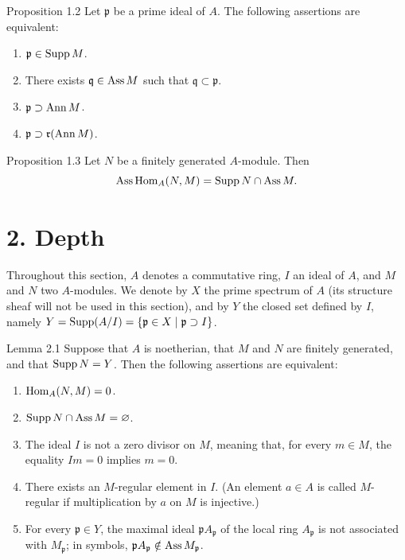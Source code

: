 \begin{sgastatement}{Proposition 1.2}
Let $\mathfrak p$ be a prime ideal of $A$. The following assertions are
equivalent:
\begin{enumerate}[label=\textup{(\roman*)},leftmargin=2.8em]
  \item $\mathfrak p\in\operatorname{Supp} M$.
  \item There exists $\mathfrak q\in\operatorname{Ass} M$ such that
  $\mathfrak q\subset\mathfrak p$.
  \item $\mathfrak p\supset\operatorname{Ann} M$.
  \item[\textup{(iii bis)}] $\mathfrak p\supset\mathfrak r(\operatorname{Ann} M)$.
\end{enumerate}
\end{sgastatement}

\begin{sgastatement}{Proposition 1.3}
Let $N$ be a finitely generated $A$-module. Then
\[
  \operatorname{Ass}\operatorname{Hom}_A(N,M)=\operatorname{Supp} N\cap\operatorname{Ass} M.
\]
\end{sgastatement}



\section*{2. Depth}

Throughout this section, $A$ denotes a commutative ring, $I$ an ideal of
$A$, and $M$ and $N$ two $A$-modules. We denote by $X$ the prime spectrum of
$A$ (its structure sheaf will not be used in this section), and by $Y$ the
closed set defined by $I$, namely
$Y=\operatorname{Supp}(A/I)=\{\mathfrak p\in X\mid \mathfrak p\supset I\}$.

\begin{sgastatement}{Lemma 2.1}
Suppose that $A$ is noetherian, that $M$ and $N$ are finitely generated, and
that $\operatorname{Supp} N=Y$. Then the following assertions are equivalent:
\begin{enumerate}[label=\textup{(\roman*)},leftmargin=2.6em]
\item $\operatorname{Hom}_A(N,M)=0$.
\item $\operatorname{Supp} N\cap\operatorname{Ass} M=\varnothing$.
\item The ideal $I$ is not a zero divisor on $M$, meaning that, for every
$m\in M$, the equality $Im=0$ implies $m=0$.
\item There exists an $M$-regular element in $I$. (An element $a\in A$ is
called $M$-regular if multiplication by $a$ on $M$ is injective.)
\item For every $\mathfrak p\in Y$, the maximal ideal
$\mathfrak pA_{\mathfrak p}$ of the local ring $A_{\mathfrak p}$ is not
associated with $M_{\mathfrak p}$; in symbols,
$\mathfrak pA_{\mathfrak p}\notin\operatorname{Ass} M_{\mathfrak p}$.
\end{enumerate}
\end{sgastatement}

